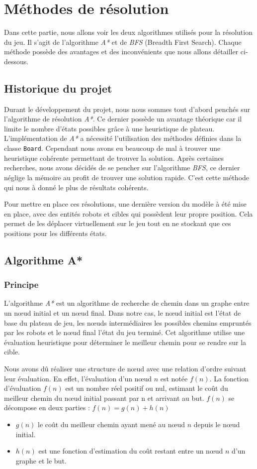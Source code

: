 \documentclass[a4paper]{article} %
\begin{document}
\section{Méthodes de résolution}
	Dans cette partie, nous allons voir les deux algorithmes utilisés pour la résolution du jeu. Il s'agit de l'algorithme \textsl{A*} et de \textsl{BFS} (Breadth First Search). Chaque méthode possède des avantages et des inconvénients que nous allons détailler ci-dessous.
	
	\subsection{Historique du projet}
Durant le développement du projet, nous nous sommes tout d'abord penchés sur l'algorithme de résolution \textsl{A*}. Ce dernier possède un avantage théorique car il limite le nombre d'états possibles grâce à une heuristique de plateau. L'implémentation de \textsl{A*} a nécessité l'utilisation des méthodes définies dans la classe \texttt{Board}. Cependant nous avons eu beaucoup de mal à trouver une heuristique cohérente permettant de trouver la solution. Après certaines recherches, nous avons décidés de se pencher sur l'algorithme \textsl{BFS}, ce dernier néglige la mémoire au profit de trouver une solution rapide. C'est cette méthode qui nous à donné le plus de résultats cohérents.

Pour mettre en place ces résolutions, une dernière version du modèle à été mise en place, avec des entités robots et cibles qui possèdent leur propre position. Cela permet de les déplacer virtuellement sur le jeu tout en ne stockant que ces positions pour les différents états.

	\subsection{Algorithme A*}
		\subsubsection{Principe}
L'algorithme \textsl{A*} est un algorithme de recherche de chemin dans un graphe entre un nœud initial et un nœud final. Dans notre cas, le nœud initial est l'état de base du plateau de jeu, les nœuds intermédiaires les possibles chemins empruntés par les robots et le nœud final l'état du jeu terminé.
Cet algorithme utilise une évaluation heuristique pour déterminer le meilleur chemin pour se rendre sur la cible.

Nous avons dû réaliser une structure de nœud avec une relation d'ordre suivant leur évaluation. En effet, l'évaluation d'un nœud $n$ est notée $f(n)$. La fonction d'évaluation $f(n)$ est un nombre réel positif ou nul, estimant le coût du meilleur chemin du nœud initial passant par n et arrivant au but. $f(n)$ se décompose en deux parties : $f(n) = g(n) + h(n)$
\begin{itemize}
\item $g(n)$ le coût du meilleur chemin ayant mené au nœud $n$ depuis le nœud initial.
\item $h(n)$ est une fonction d'estimation du coût restant entre un nœud $n$ d'un graphe et le but.
\end{itemize}
\end{document}
